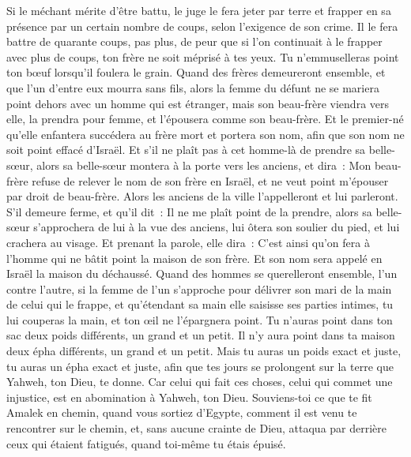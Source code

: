 \begin{multicols}{2}
Si le méchant mérite d'être battu, le juge le fera jeter par terre et frapper en sa présence par un certain nombre de coups, selon l'exigence de son crime.
Il le fera battre de quarante coups, pas plus, de peur que si l'on continuait à le frapper avec plus de coups, ton frère ne soit méprisé à tes yeux.
Tu n'emmuselleras point ton bœuf lorsqu'il foulera le grain.
Quand des frères demeureront ensemble, et que l'un d'entre eux mourra sans fils, alors la femme du défunt ne se mariera point dehors avec un homme qui est étranger, mais son beau-frère viendra vers elle, la prendra pour femme, et l'épousera comme son beau-frère.
Et le premier-né qu'elle enfantera succédera au frère mort et portera son nom, afin que son nom ne soit point effacé d'Israël.
Et s'il ne plaît pas à cet homme-là de prendre sa belle-sœur, alors sa belle-sœur montera à la porte vers les anciens, et dira~: Mon beau-frère refuse de relever le nom de son frère en Israël, et ne veut point m'épouser par droit de beau-frère.
Alors les anciens de la ville l'appelleront et lui parleront. S'il demeure ferme, et qu'il dit~: Il ne me plaît point de la prendre,
alors sa belle-sœur s'approchera de lui à la vue des anciens, lui ôtera son soulier du pied, et lui crachera au visage. Et prenant la parole, elle dira~: C'est ainsi qu'on fera à l'homme qui ne bâtit point la maison de son frère.
Et son nom sera appelé en Israël la maison du déchaussé.
Quand des hommes se querelleront ensemble, l'un contre l'autre, si la femme de l'un s'approche pour délivrer son mari de la main de celui qui le frappe, et qu'étendant sa main elle saisisse ses parties intimes,
tu lui couperas la main, et ton œil ne l'épargnera point.
Tu n'auras point dans ton sac deux poids différents, un grand et un petit.
Il n'y aura point dans ta maison deux épha différents, un grand et un petit.
Mais tu auras un poids exact et juste, tu auras un épha exact et juste, afin que tes jours se prolongent sur la terre que Yahweh, ton Dieu, te donne.
Car celui qui fait ces choses, celui qui commet une injustice, est en abomination à Yahweh, ton Dieu.
Souviens-toi ce que te fit Amalek en chemin, quand vous sortiez d'Egypte,
comment il est venu te rencontrer sur le chemin, et, sans aucune crainte de Dieu, attaqua par derrière ceux qui étaient fatigués, quand toi-même tu étais épuisé.

\end{multicols}
